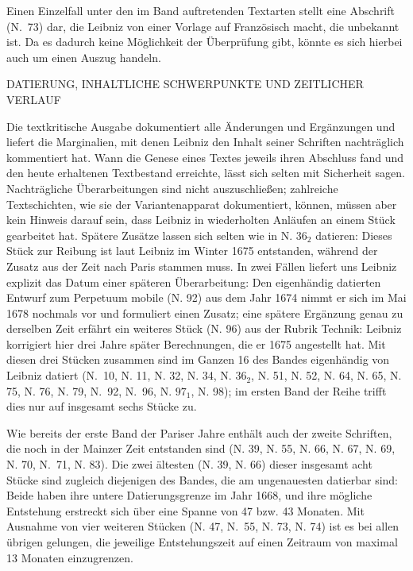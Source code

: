 Einen Einzelfall unter den im Band auftretenden Textarten stellt eine Abschrift (N.~73) dar, die Leibniz von einer Vorlage auf Französisch macht, die unbekannt ist. Da es dadurch keine Möglichkeit der Überprüfung gibt, könnte es sich hierbei auch um einen Auszug handeln.\par
\par\vspace{6.0ex}
\noindent
\noindent\uppercase{Datierung, inhaltliche Schwerpunkte und zeitlicher Verlauf}
\par\vspace{1.0ex}
\noindent
Die textkritische Ausgabe dokumentiert alle Änderungen und Ergänzungen und liefert die Marginalien, mit denen Leibniz den Inhalt seiner Schriften nachträglich kommentiert hat. Wann die Genese eines Textes jeweils ihren Abschluss fand und den heute erhaltenen Textbestand erreichte, lässt sich selten mit Sicherheit sagen. Nachträgliche Überarbeitungen sind nicht auszuschließen; zahlreiche Textschichten, wie sie der Variantenapparat dokumentiert, können, müssen aber kein Hinweis darauf sein, dass Leibniz in wiederholten Anläufen an einem Stück gearbeitet hat. Spätere Zusätze lassen sich selten wie in N. $36_2$ datieren: Dieses Stück zur Reibung ist laut Leibniz im Winter 1675 entstanden, während der Zusatz aus der Zeit nach Paris stammen muss. In zwei Fällen liefert uns Leibniz explizit das Datum einer späteren Überarbeitung: Den eigenhändig datierten Entwurf zum Perpetuum mobile (N. 92) aus dem Jahr 1674 nimmt er sich im Mai 1678 nochmals vor und formuliert einen Zusatz; eine spätere Ergänzung genau zu derselben Zeit erfährt ein weiteres Stück (N. 96) aus der Rubrik Technik: Leibniz korrigiert hier drei Jahre später Berechnungen, die er 1675 angestellt hat. Mit diesen drei Stücken zusammen sind im Ganzen 16 des Bandes eigenhändig von Leibniz datiert (N.~10, N. 11, N. 32, N. 34, N. $36_2$, N. 51, N. 52, N. 64, N. 65, N. 75, N. 76, N. 79, N.~92, N.~96, N. $97_1$, N. 98); im ersten Band der Reihe trifft dies nur auf insgesamt sechs Stücke zu.\par
Wie bereits der erste Band der Pariser Jahre enthält auch der zweite Schriften, die noch in der Mainzer Zeit entstanden sind (N. 39, N. 55, N. 66, N. 67, N. 69, N. 70, N.~71, N. 83). Die zwei ältesten (N. 39, N. 66) dieser insgesamt acht Stücke sind zugleich diejenigen des Bandes, die am ungenauesten datierbar sind: Beide haben ihre untere Datierungsgrenze im Jahr 1668, und ihre mögliche Entstehung erstreckt sich über eine Spanne von 47 bzw. 43 Monaten. Mit Ausnahme von vier weiteren Stücken (N. 47, N.~55, N. 73, N. 74) ist es bei allen übrigen gelungen, die jeweilige Entstehungszeit auf einen Zeitraum von maximal 13 Monaten einzugrenzen.\par 
